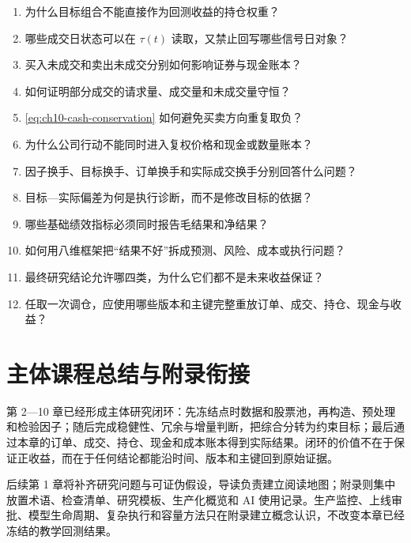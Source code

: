 \begin{quizbox}
\begin{enumerate}
  \item 为什么目标组合不能直接作为回测收益的持仓权重？
  \item 哪些成交日状态可以在 \(\tau(t)\) 读取，又禁止回写哪些信号日对象？
  \item 买入未成交和卖出未成交分别如何影响证券与现金账本？
  \item 如何证明部分成交的请求量、成交量和未成交量守恒？
  \item \cref{eq:ch10-cash-conservation} 如何避免买卖方向重复取负？
  \item 为什么公司行动不能同时进入复权价格和现金或数量账本？
  \item 因子换手、目标换手、订单换手和实际成交换手分别回答什么问题？
  \item 目标---实际偏差为何是执行诊断，而不是修改目标的依据？
  \item 哪些基础绩效指标必须同时报告毛结果和净结果？
  \item 如何用八维框架把“结果不好”拆成预测、风险、成本或执行问题？
  \item 最终研究结论允许哪四类，为什么它们都不是未来收益保证？
  \item 任取一次调仓，应使用哪些版本和主键完整重放订单、成交、持仓、现金与收益？
\end{enumerate}
\end{quizbox}

\section{主体课程总结与附录衔接}

第 2---10 章已经形成主体研究闭环：先冻结点时数据和股票池，再构造、预处理和检验因子；随后完成稳健性、冗余与增量判断，把综合分转为约束目标；最后通过本章的订单、成交、持仓、现金和成本账本得到实际结果。闭环的价值不在于保证正收益，而在于任何结论都能沿时间、版本和主键回到原始证据。

后续第 1 章将补齐研究问题与可证伪假设，导读负责建立阅读地图；附录则集中放置术语、检查清单、研究模板、生产化概览和 AI 使用记录。生产监控、上线审批、模型生命周期、复杂执行和容量方法只在附录建立概念认识，不改变本章已经冻结的教学回测结果。

